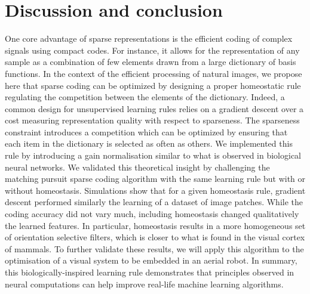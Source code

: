 \documentclass[a4paper, 11pt, draft]{article} %
\begin{document}
\section{Discussion and conclusion}\label{discussion-et-conclusion}



%
One core advantage of sparse representations is the efficient coding of complex signals using compact codes. For instance, it allows for the representation of any sample as a combination of few elements drawn from a large dictionary of basis functions. In the context of the efficient processing of natural images, we propose here that sparse coding can be optimized by designing a proper homeostatic rule regulating the competition between the elements of the dictionary. Indeed, a common design for unsupervised learning rules relies on a gradient descent over a cost measuring representation quality with respect to sparseness. The sparseness constraint introduces a competition which can be optimized by ensuring that each item in the dictionary is selected as often as others. We implemented this rule by introducing a gain normalisation similar to what is observed in biological neural networks. We validated this theoretical insight by challenging the matching pursuit sparse coding algorithm with the same learning rule but with or without homeostasis. Simulations show that for a given homeostasis rule, gradient descent performed similarly the learning of a dataset of image patches. While the coding accuracy did not vary much, including homeostasis changed qualitatively the learned features. In particular, homeostasis results in a more homogeneous set of orientation selective filters, which is closer to what is found in the visual cortex of mammals. To further validate these results, we will apply this algorithm to the optimisation of a visual system to be embedded in an aerial robot. In summary, this biologically-inspired learning rule demonstrates that principles observed in neural computations can help improve real-life machine learning algorithms. 
\end{document}
